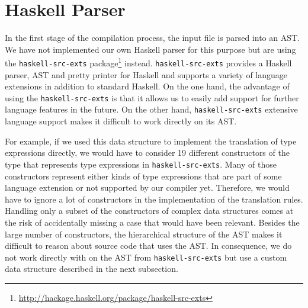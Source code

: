 \section{Haskell Parser} \label{sec:implementation:haskell-src-exts}
In the first stage of the compilation process, the input file is parsed into an AST.
We have not implemented our own Haskell parser for this purpose but are using the \texttt{haskell-src-exts} package\footnote{\url{http://hackage.haskell.org/package/haskell-src-exts}} instead.
\texttt{haskell-src-exts} provides a Haskell parser, AST and pretty printer for Haskell and supports a variety of language extensions in addition to standard Haskell.
On the one hand, the advantage of using the \texttt{haskell-src-exts} is that it allows us to easily add support for further language features in the future.
On the other hand, \texttt{haskell-src-exts} extensive language support makes it difficult to work directly on its AST.

For example, if we used this data structure to implement the translation of type expressions directly, we would have to consider 19 different constructors of the type that represents type expressions in \texttt{haskell-src-exts}.
Many of those constructors represent either kinds of type expressions that are part of some language extension or not supported by our compiler yet.
Therefore, we would have to ignore a lot of constructors in the implementation of the translation rules.
Handling only a subset of the constructors of complex data structures comes at the risk of accidentally missing a case that would have been relevant.
Besides the large number of constructors, the hierarchical structure of the AST makes it difficult to reason about source code that uses the AST.
In consequence, we do not work directly with on the AST from \texttt{haskell-src-exts} but use a custom data structure described in the next subsection.
